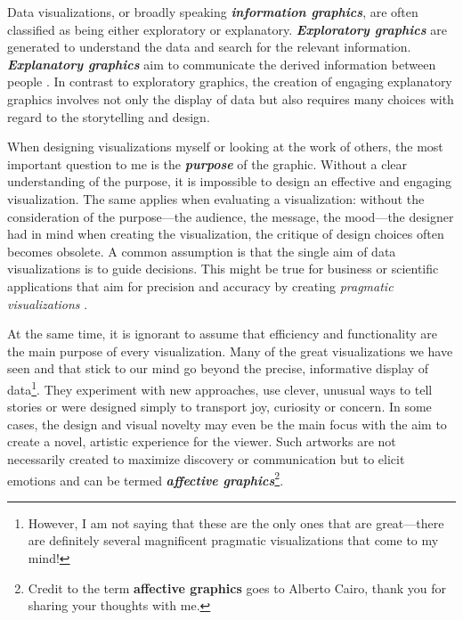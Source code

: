 \documentclass[
]{krantz}
\begin{document}
Data visualizations, or broadly speaking \textbf{\emph{information graphics}}, are
often classified as being either exploratory or explanatory.
\textbf{\emph{Exploratory graphics}} are generated to understand the data and
search for the relevant information. \textbf{\emph{Explanatory graphics}} aim to
communicate the derived information between people
\citep{koponen&hilden2019}. In contrast to exploratory graphics, the creation
of engaging explanatory graphics involves not only the display of data
but also requires many choices with regard to the storytelling and
design.

When designing visualizations myself or looking at the work of others,
the most important question to me is the \textbf{\emph{purpose}} of the graphic.
Without a clear understanding of the purpose, it is impossible to design
an effective and engaging visualization. The same applies when
evaluating a visualization: without the consideration of the
purpose---the audience, the message, the mood---the designer had in mind
when creating the visualization, the critique of design choices often
becomes obsolete. A common assumption is that the single aim of data
visualizations is to guide decisions. This might be true for business or
scientific applications that aim for precision and accuracy by creating
\emph{pragmatic visualizations} \citep{kosara2007}.

At the same time, it is ignorant to assume that efficiency and
functionality are the main purpose of every visualization. Many of the
great visualizations we have seen and that stick to our mind go beyond
the precise, informative display of data\footnote{However, I am not saying that these are the only ones
  that are great---there are definitely several magnificent pragmatic
  visualizations that come to my mind!}. They
experiment with new approaches, use clever, unusual ways to tell stories
or were designed simply to transport joy, curiosity or concern. In some
cases, the design and visual novelty may even be the main focus with the
aim to create a novel, artistic experience for the viewer. Such artworks
are not necessarily created to maximize discovery or communication but
to elicit emotions and can be termed \textbf{\emph{affective
graphics}}\footnote{Credit to the term \textbf{affective graphics} goes to
  Alberto Cairo, thank you for sharing your thoughts with me.}.
\end{document}
